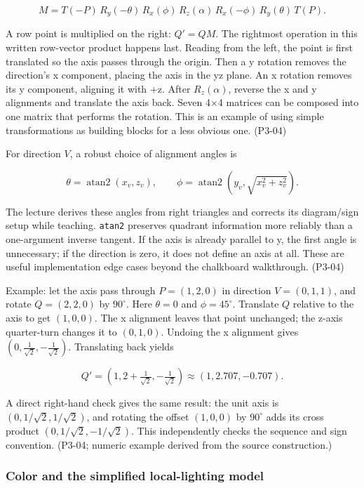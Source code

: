 \[
M=T(-P)\,R_y(-\theta)\,R_x(\phi)\,R_z(\alpha)\,R_x(-\phi)\,R_y(\theta)\,T(P).
\]

A row point is multiplied on the right: \(Q'=QM\). The rightmost operation in this written row-vector product happens last. Reading from the left, the point is first translated so the axis passes through the origin. Then a y rotation removes the direction's x component, placing the axis in the yz plane. An x rotation removes its y component, aligning it with +z. After \(R_z(\alpha)\), reverse the x and y alignments and translate the axis back. Seven 4×4 matrices can be composed into one matrix that performs the rotation. This is an example of using simple transformations as building blocks for a less obvious one. (P3-04)

For direction \(V\), a robust choice of alignment angles is

\[
\theta=\operatorname{atan2}(x_v,z_v),\qquad
\phi=\operatorname{atan2}\left(y_v,\sqrt{x_v^2+z_v^2}\right).
\]

The lecture derives these angles from right triangles and corrects its diagram/sign setup while teaching. \texttt{atan2} preserves quadrant information more reliably than a one-argument inverse tangent. If the axis is already parallel to y, the first angle is unnecessary; if the direction is zero, it does not define an axis at all. These are useful implementation edge cases beyond the chalkboard walkthrough. (P3-04)

Example: let the axis pass through \(P=(1,2,0)\) in direction \(V=(0,1,1)\), and rotate \(Q=(2,2,0)\) by \(90^\circ\). Here \(\theta=0\) and \(\phi=45^\circ\). Translate \(Q\) relative to the axis to get \((1,0,0)\). The x alignment leaves that point unchanged; the z-axis quarter-turn changes it to \((0,1,0)\). Undoing the x alignment gives \((0,\frac{1}{\sqrt2},-\frac{1}{\sqrt2})\). Translating back yields

\[
Q'=(1,2+\tfrac{1}{\sqrt2},-\tfrac{1}{\sqrt2})\approx(1,2.707,-0.707).
\]

A direct right-hand check gives the same result: the unit axis is \((0,1/\sqrt2,1/\sqrt2)\), and rotating the offset \((1,0,0)\) by \(90^\circ\) adds its cross product \((0,1/\sqrt2,-1/\sqrt2)\). This independently checks the sequence and sign convention. (P3-04; numeric example derived from the source construction.)

\subsubsection{Color and the simplified local-lighting model}\label{03-visual-computing-i-ch011-color-and-the-simplified-local-lighting-model}

